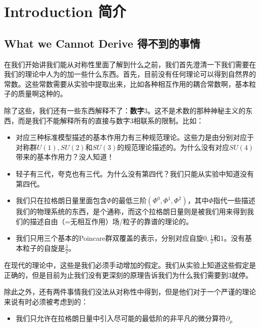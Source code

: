 


\chapter{Introduction 简介}\label{chap1}

\section{What we Cannot Derive 得不到的事情}

在我们开始讲我们能从对称性里面了解到什么之前，我们首先澄清一下我们需要在我们的理论中人为的加一些什么东西。首先，目前没有任何理论可以得到自然界的常数。这些常数需要从实验中提取出来，比如各种相互作用的耦合常数啊，基本粒子的质量啊这种的。

除了这些，我们还有一些东西解释不了：{\bf 数字$3$}。这不是术数的那种神秘主义的东西，而是我们不能解释所有的直接与数字$3$相联系的限制。比如：

\begin{itemize}
\item 对应三种标准模型描述的基本作用力有三种规范理论。这些力是由分别对应于对称群$U(1), SU(2)$和$SU(3)$的规范理论描述的。为什么没有对应$SU(4)$带来的基本作用力？没人知道！
\item 轻子有三代，夸克也有三代。为什么没有第四代？我们只能从实验中知道没有第四代。
\item 我们只在拉格朗日量里面包含$\Phi$的最低三阶$(\Phi^0, \Phi^1, \Phi^2)$，其中$\Phi$指代一些描述我们的物理系统的东西，是个通称，而这个拉格朗日量则是被我们用来得到我们的描述自由（=无相互作用）场/粒子的靠谱的理论的。
\item 我们只用三个基本的Poincare群双覆盖的表示，分别对应自旋$0, \tfrac{1}{2}$和$1$。没有基本粒子的自旋是$\tfrac{3}{2}$。
\end{itemize}

在现代的理论中，这些是我们必须手动增加的假定。我们从实验上知道这些假定是正确的，但是目前为止我们没有更深刻的原理告诉我们为什么我们需要到$3$就停。

除此之外，还有两件事情我们没法从对称性中得到，但是他们对于一个严谨的理论来说有时必须被考虑到的：

\begin{itemize}
\item 我们只允许在拉格朗日量中引入尽可能的最低阶的非平凡的微分算符$\partial_\mu$
\end{itemize}